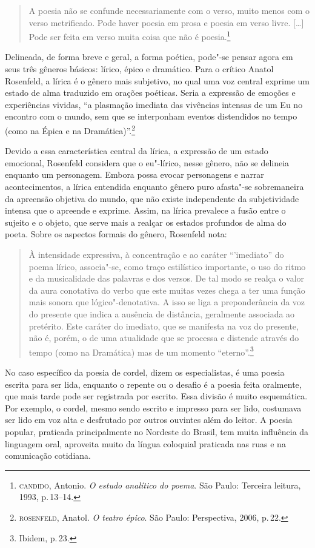 \begin{quote}
A poesia não se confunde necessariamente com o verso, muito menos com o verso metrificado. Pode haver poesia em prosa e poesia em verso livre. [\ldots]
Pode ser feita em verso muita coisa que não é poesia.\footnote{\textsc{candido}, Antonio. \textit{O estudo analítico do poema}. São Paulo: Terceira leitura, 1993, p.\,13--14.}
\end{quote}

Delineada, de forma breve e geral, a forma poética, pode"-se pensar agora em seus três gêneros básicos: lírico, épico e dramático.
Para o crítico Anatol Rosenfeld, a lírica é o gênero mais subjetivo, no qual uma voz central exprime um estado de alma traduzido em orações poéticas.
Seria a expressão de emoções e experiências vividas, ``a plasmação imediata das vivências intensas de um Eu no encontro com o mundo, sem que se interponham eventos distendidos no tempo (como na Épica e na Dramática)''.\footnote{\textsc{rosenfeld}, Anatol. \textit{O teatro épico}. São Paulo: Perspectiva, 2006, p.\,22.}

Devido a essa característica central da lírica, a expressão de um estado emocional, Rosenfeld considera que o eu"-lírico, nesse gênero, não se delineia enquanto um personagem. Embora possa evocar personagens e narrar acontecimentos, a lírica entendida enquanto gênero puro afasta"-se sobremaneira da apreensão objetiva do mundo, que não existe independente da subjetividade intensa que o apreende e exprime. Assim, na lírica prevalece a fusão entre o sujeito e o objeto, que serve mais a realçar os estados profundos de alma do poeta.
Sobre os aspectos formais do gênero, Rosenfeld nota:

\begin{quote}
À intensidade expressiva, à concentração e ao caráter ``'imediato'' do poema lírico, associa"-se, como traço estilístico importante, o uso do ritmo e da musicalidade das palavras e dos versos. De tal modo se realça o valor da aura conotativa do verbo que este muitas vezes chega a ter uma função mais sonora que lógico"-denotativa. A isso se liga a preponderância da voz do presente que indica a ausência de distância, geralmente associada ao pretérito. Este caráter do imediato, que se manifesta na voz do presente, não é, porém, o de uma atualidade que se processa e distende através do tempo (como na Dramática) mas de um momento ``eterno''.\footnote{Ibidem, p.\,23.}
\end{quote}

No caso específico da poesia de cordel, dizem os especialistas, é uma poesia escrita para
ser lida, enquanto o repente ou o desafio é a poesia feita oralmente,
que mais tarde pode ser registrada por escrito. Essa divisão é muito
esquemática. Por exemplo, o cordel, mesmo sendo escrito e impresso para
ser lido, costumava ser lido em voz alta e desfrutado por outros
ouvintes além do leitor. A poesia popular, praticada principalmente no
Nordeste do Brasil, tem muita influência da linguagem oral, aproveita
muito da língua coloquial praticada nas ruas e na comunicação
cotidiana. 

